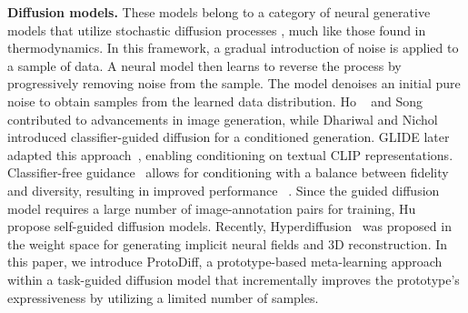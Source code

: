 \textbf{Diffusion models.} These models belong to a category of neural generative models that utilize stochastic diffusion processes \cite{sohl2015deep,song2020denoising}, much like those found in thermodynamics. In this framework, a gradual introduction of noise 
is applied to a sample of data. 
A neural model then learns to reverse the process by progressively removing noise from the sample. The model denoises an initial pure noise to obtain samples from the learned data distribution. Ho \etal~\cite{ho2020denoising} and Song \etal~\cite{song2020denoising} contributed to advancements in image generation, while Dhariwal and Nichol \cite{dhariwal2021diffusion} introduced classifier-guided diffusion for a conditioned generation. GLIDE later adapted this approach~\cite{nichol2021glide}, enabling conditioning on textual CLIP representations. Classifier-free guidance~\cite{ho2022classifier} allows for conditioning with a balance between fidelity and diversity, resulting in improved performance ~\cite{nichol2021glide}. Since the guided diffusion model requires a large number of image-annotation pairs for training, Hu \etal~\cite{hu2022self} propose self-guided diffusion models. 
Recently, Hyperdiffusion~\cite{lutati2022ocd, erkocc2023hyperdiffusion} was proposed in the weight space for  generating implicit neural fields and 3D reconstruction.
In this paper, we introduce ProtoDiff, a prototype-based meta-learning approach within a task-guided diffusion model that incrementally improves the prototype's expressiveness by utilizing a limited number of samples.


